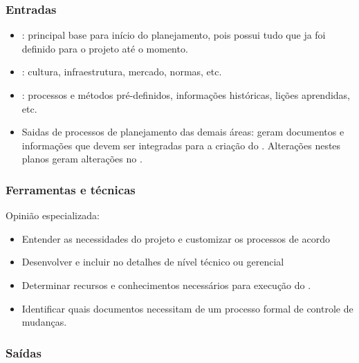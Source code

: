 \subsubsection{Entradas}

\begin{itemize}

\item \termo: principal base para início do planejamento, pois possui tudo que ja foi definido para o projeto até o momento.

\item \amb: cultura, infraestrutura, mercado, normas, etc.

\item \ativ: processos e métodos pré-definidos, informações históricas, lições aprendidas, etc.

\item Saidas de processos de planejamento das demais áreas: geram documentos e informações que devem ser integradas para a criação do \planproj. Alterações nestes planos geram alterações no \planproj.

\end{itemize}

\subsubsection{Ferramentas e técnicas}

Opinião especializada:

\begin{itemize}

\item Entender as necessidades do projeto e customizar os processos de acordo

\item Desenvolver e incluir no \planproj detalhes de nível técnico ou gerencial

\item Determinar recursos e conhecimentos necessários para execução do \planproj.

\item Identificar quais documentos necessitam de um processo formal de controle de mudanças.

\end{itemize}

\subsubsection{Saídas}

